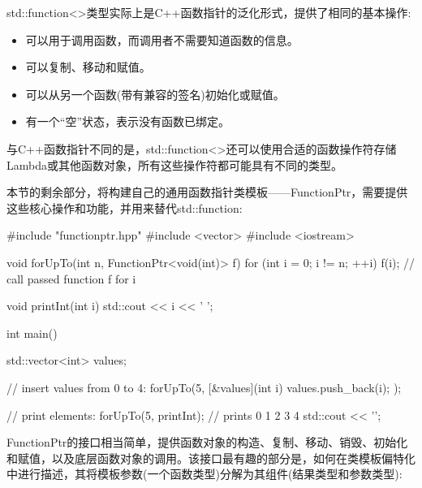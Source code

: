 std::function<>类型实际上是C++函数指针的泛化形式，提供了相同的基本操作:

\begin{itemize}
\item 
可以用于调用函数，而调用者不需要知道函数的信息。

\item 
可以复制、移动和赋值。

\item 
可以从另一个函数(带有兼容的签名)初始化或赋值。

\item 
有一个“空”状态，表示没有函数已绑定。
\end{itemize}

与C++函数指针不同的是，std::function<>还可以使用合适的函数操作符存储Lambda或其他函数对象，所有这些操作符都可能具有不同的类型。

本节的剩余部分，将构建自己的通用函数指针类模板——FunctionPtr，需要提供这些核心操作和功能，并用来替代std::function:

\begin{cpp}
#include "functionptr.hpp"
#include <vector>
#include <iostream>

void forUpTo(int n, FunctionPtr<void(int)> f)
{
	for (int i = 0; i != n; ++i)
	{
		f(i); // call passed function f for i
	}
}

void printInt(int i)
{
	std::cout << i << ’ ’;
}

int main()
{
	std::vector<int> values;
	
	// insert values from 0 to 4:
	forUpTo(5,
			[&values](int i) {
				values.push_back(i);
			});
		
	// print elements:
	forUpTo(5,
			printInt); // prints 0 1 2 3 4
	std::cout << ’\n’;
}
\end{cpp}

FunctionPtr的接口相当简单，提供函数对象的构造、复制、移动、销毁、初始化和赋值，以及底层函数对象的调用。该接口最有趣的部分是，如何在类模板偏特化中进行描述，其将模板参数(一个函数类型)分解为其组件(结果类型和参数类型):


